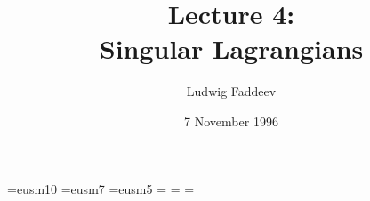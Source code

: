 
\font\teneusm=eusm10  \font\seveneusm=eusm7 
\font\fiveeusm=eusm5 
\newfam\eusmfam 
\textfont\eusmfam=\teneusm 
\scriptfont\eusmfam=\seveneusm 
\scriptscriptfont\eusmfam=\fiveeusm 
\def\Scr#1{{\fam\eusmfam\relax#1}}

\newcommand{\ScrA}{{\Scr A}} \newcommand{\ScrB}{{\Scr B}}
\newcommand{\ScrC}{{\Scr C}} \newcommand{\ScrD}{{\Scr D}}
\newcommand{\ScrE}{{\Scr E}} \newcommand{\ScrF}{{\Scr F}}
\newcommand{\ScrG}{{\Scr G}} \newcommand{\ScrH}{{\Scr H}}
\newcommand{\ScrI}{{\Scr I}} \newcommand{\ScrJ}{{\Scr J}}
\newcommand{\ScrK}{{\Scr K}} \newcommand{\ScrL}{{\Scr L}}
\newcommand{\ScrM}{{\Scr M}} \newcommand{\ScrN}{{\Scr N}}
\newcommand{\ScrO}{{\Scr O}} \newcommand{\ScrP}{{\Scr P}}
\newcommand{\ScrQ}{{\Scr Q}} \newcommand{\ScrR}{{\Scr R}}
\newcommand{\ScrS}{{\Scr S}} \newcommand{\ScrT}{{\Scr T}}
\newcommand{\ScrU}{{\Scr U}} \newcommand{\ScrV}{{\Scr V}}
\newcommand{\ScrW}{{\Scr W}} \newcommand{\ScrX}{{\Scr X}}
\newcommand{\ScrY}{{\Scr Y}} \newcommand{\ScrZ}{{\Scr Z}}


\newcommand{\grA}{{\frak A}}



\def\eps{\varepsilon}

\setlength{\textwidth}{6.5in}
\setlength{\textheight}{9.1in}
\setlength{\evensidemargin}{0in}
\setlength{\oddsidemargin}{0in}
\setlength{\topmargin}{-.75in}
\setlength{\parskip}{0.3\baselineskip}


\newcommand{\Le}{{{\mathchoice{\,{\scriptstyle\le}\,}
  {\,{\scriptstyle\le}\,}
  {\,{\scriptscriptstyle\le}\,}{\,{\scriptscriptstyle\le}\,}}}}
\newcommand{\Ge}{{{\mathchoice{\,{\scriptstyle\ge}\,}
  {\,{\scriptstyle\ge}\,}
  {\,{\scriptscriptstyle\ge}\,}{\,{\scriptscriptstyle\ge}\,}}}}




\nc{\bra}{  < }
\nc{\ket}{ > }
\nc{\triang}{ { \bigtriangleup} }

\nc{\hatastar}{{ \hat{\astar} }}



\title{Lecture 4:\\
Singular Lagrangians}
\author{Ludwig Faddeev}
\date{7  November  1996}

